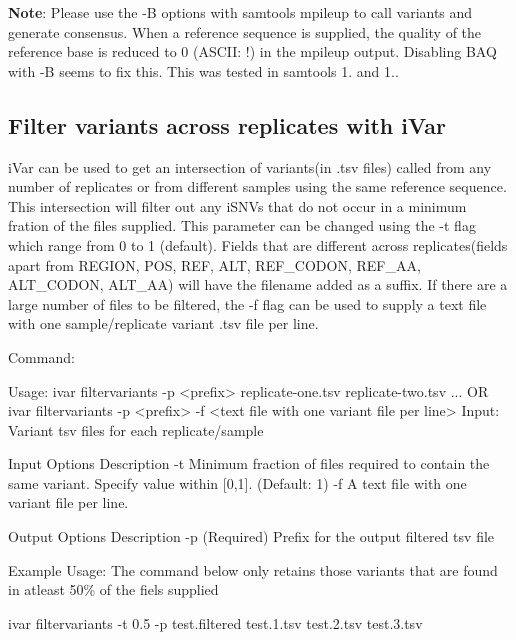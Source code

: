 {\bfseries Note}\+: Please use the -\/B options with {\ttfamily samtools mpileup} to call variants and generate consensus. When a reference sequence is supplied, the quality of the reference base is reduced to 0 (A\+S\+C\+II\+: !) in the mpileup output. Disabling B\+AQ with -\/B seems to fix this. This was tested in samtools 1. and 1..\hypertarget{manualpage_autotoc_md18}{}\subsection{Filter variants across replicates with i\+Var}\label{manualpage_autotoc_md18}
i\+Var can be used to get an intersection of variants(in .tsv files) called from any number of replicates or from different samples using the same reference sequence. This intersection will filter out any i\+S\+N\+Vs that do not occur in a minimum fration of the files supplied. This parameter can be changed using the {\ttfamily -\/t} flag which range from 0 to 1 (default). Fields that are different across replicates(fields apart from R\+E\+G\+I\+O\+N, P\+O\+S, R\+E\+F, A\+L\+T, R\+E\+F\+\_\+\+C\+O\+D\+O\+N, R\+E\+F\+\_\+\+A\+A, A\+L\+T\+\_\+\+C\+O\+D\+O\+N, A\+L\+T\+\_\+\+A\+A) will have the filename added as a suffix. If there are a large number of files to be filtered, the {\ttfamily -\/f} flag can be used to supply a text file with one sample/replicate variant .tsv file per line.

Command\+:


\begin{DoxyCode}
Usage: ivar filtervariants -p <prefix> replicate-one.tsv replicate-two.tsv ... OR ivar filtervariants -p
       <prefix> -f <text file with one variant file per line>
Input: Variant tsv files for each replicate/sample

Input Options    Description
           -t    Minimum fraction of files required to contain the same variant. Specify value within
       [0,1]. (Default: 1)
           -f    A text file with one variant file per line.

Output Options   Description
           -p    (Required) Prefix for the output filtered tsv file
\end{DoxyCode}


Example Usage\+: The command below only retains those variants that are found in atleast 50\% of the fiels supplied


\begin{DoxyCode}
ivar filtervariants -t 0.5 -p test.filtered test.1.tsv test.2.tsv test.3.tsv
\end{DoxyCode}


